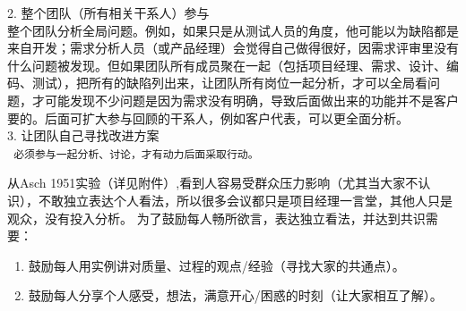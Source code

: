 2. 整个团队（所有相关干系人）参与\\
整个团队分析全局问题。例如，如果只是从测试人员的角度，他可能以为缺陷都是来自开发；需求分析人员（或产品经理）会觉得自己做得很好，因需求评审里没有什么问题被发现。但如果团队所有成员聚在一起（包括项目经理、需求、设计、编码、测试），把所有的缺陷列出来，让团队所有岗位一起分析，才可以全局看问题，才可能发现不少问题是因为需求没有明确，导致后面做出来的功能并不是客户要的。后面可扩大参与回顾的干系人，例如客户代表，可以更全面分析。\\
3. 让团队自己寻找改进方案 \\

\texttt{~必须参与一起分析、讨论，才有动力后面采取行动。}


从Asch
1951实验（详见附件）,看到人容易受群众压力影响（尤其当大家不认识），不敢独立表达个人看法，所以很多会议都只是项目经理一言堂，其他人只是观众，没有投入分析。
为了鼓励每人畅所欲言，表达独立看法，并达到共识需要：

\begin{enumerate}
\tightlist
\item
  鼓励每人用实例讲对质量、过程的观点/经验（寻找大家的共通点）。
\item
  鼓励每人分享个人感受，想法，满意开心/困惑的时刻（让大家相互了解）。
\end{enumerate}

